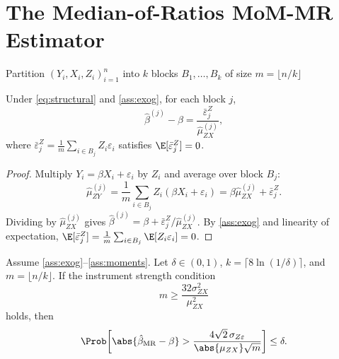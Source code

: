 \section{The Median-of-Ratios MoM-MR Estimator}


\label{sec:mor}

\begin{algorithm}[H]
\label{alg:mor}
\caption{Median-of-Ratios Estimator}

Partition $(Y_i,X_i,Z_i)_{i=1}^{n}$ into $k$ blocks $B_1, \dots, B_k$ of size $m = \lfloor n/k \rfloor$\;


\;
\end{algorithm}

\begin{lemma}
\label{lem:mor_decomp}
Under \eqref{eq:structural} and \ref{ass:exog}, for each block $j$,
\begin{equation}
\label{eq:block_error}
    \hat{\beta}^{(j)} - \beta = \frac{\bar{\varepsilon}_j^Z}{\hat{\mu}_{ZX}^{(j)}},
\end{equation}
where $\bar{\varepsilon}_j^Z = \frac{1}{m}\sum_{i \in B_j}Z_i\varepsilon_i$ satisfies $\E[\bar{\varepsilon}_j^Z] = 0$.
\end{lemma}

\begin{proof}
Multiply $Y_i = \beta X_i + \varepsilon_i$ by $Z_i$ and average over block $B_j$:
\[
    \hat{\mu}_{ZY}^{(j)} = \frac{1}{m}\sum_{i \in B_j}Z_i(\beta X_i + \varepsilon_i) = \beta\hat{\mu}_{ZX}^{(j)} + \bar{\varepsilon}_j^Z.
\]
Dividing by $\hat{\mu}_{ZX}^{(j)}$ gives $\hat{\beta}^{(j)} = \beta + \bar{\varepsilon}_j^Z/\hat{\mu}_{ZX}^{(j)}$. By \ref{ass:exog} and linearity of expectation, $\E[\bar{\varepsilon}_j^Z] = \frac{1}{m}\sum_{i \in B_j}\E[Z_i\varepsilon_i] = 0$.
\end{proof}

\begin{theorem}
\label{thm:mor}
Assume \ref{ass:exog}--\ref{ass:moments}. Let $\delta \in (0,1)$, $k = \lceil 8\ln(1/\delta) \rceil$, and $m = \lfloor n/k \rfloor$. If the instrument strength condition
\begin{equation}
\label{eq:mor_strength}
    m \geq \frac{32\sigma_{ZX}^2}{\mu_{ZX}^2}
\end{equation}
holds, then
\begin{equation}
\label{eq:mor_bound}
    \Prob\!\left[\abs{\hat{\beta}_{\mathrm{MR}} - \beta} > \frac{4\sqrt{2}\,\sigma_{Z\varepsilon}}{\abs{\mu_{ZX}}\sqrt{m}}\right] \leq \delta.
\end{equation}
\end{theorem}

